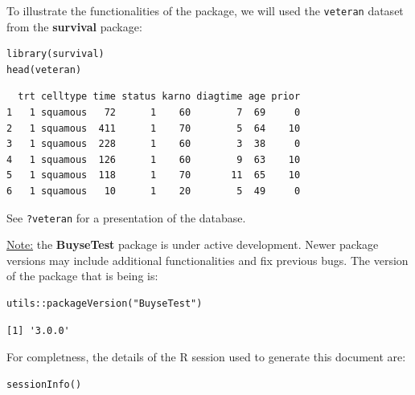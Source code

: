 \documentclass[12pt]{article}
\begin{document}
To illustrate the functionalities of the package, we will used the
\texttt{veteran} dataset from the \textbf{survival} package:
\lstset{language=r,label= ,caption= ,captionpos=b,numbers=none}
\begin{lstlisting}
library(survival)
head(veteran)
\end{lstlisting}

\begin{verbatim}
  trt celltype time status karno diagtime age prior
1   1 squamous   72      1    60        7  69     0
2   1 squamous  411      1    70        5  64    10
3   1 squamous  228      1    60        3  38     0
4   1 squamous  126      1    60        9  63    10
5   1 squamous  118      1    70       11  65    10
6   1 squamous   10      1    20        5  49     0
\end{verbatim}


See \texttt{?veteran} for a presentation of the database.

\bigskip

\uline{Note:} the \textbf{BuyseTest} package is under active development. Newer
package versions may include additional functionalities and fix
previous bugs. The version of the package that is being is:
\lstset{language=r,label= ,caption= ,captionpos=b,numbers=none}
\begin{lstlisting}
utils::packageVersion("BuyseTest")
\end{lstlisting}

\begin{verbatim}
[1] '3.0.0'
\end{verbatim}


For completness, the details of the R session used to generate this
document are:
\lstset{language=r,label= ,caption= ,captionpos=b,numbers=none}
\begin{lstlisting}
sessionInfo()
\end{lstlisting}
\end{document}
